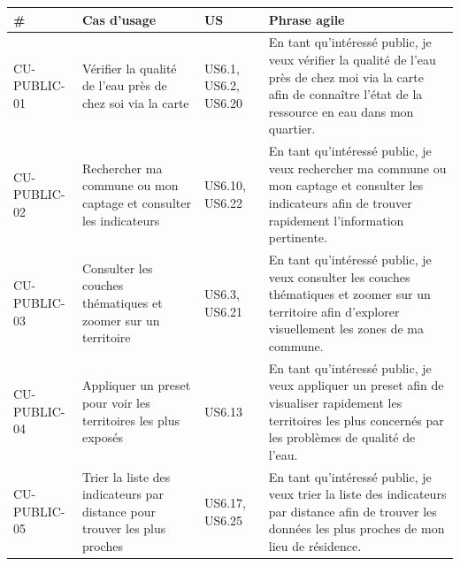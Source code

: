 \documentclass[
  paper=a4,
  oneside  ,captions=tableheading
]{scrartcl}
\begin{document}
{\def\LTcaptype{none} %
\begin{longtable}[]{@{}
  >{\raggedright\arraybackslash}p{}
  >{\raggedright\arraybackslash}p{}
  >{\raggedright\arraybackslash}p{}
  >{\raggedright\arraybackslash}p{}@{}}
\toprule\noalign{}
\begin{minipage}[b]{\linewidth}\raggedright
\#
\end{minipage} & \begin{minipage}[b]{\linewidth}\raggedright
Cas d'usage
\end{minipage} & \begin{minipage}[b]{\linewidth}\raggedright
US
\end{minipage} & \begin{minipage}[b]{\linewidth}\raggedright
Phrase agile
\end{minipage} \\
\midrule\noalign{}
\endhead
\bottomrule\noalign{}
\endlastfoot
CU-PUBLIC-01 & Vérifier la qualité de l'eau près de chez soi via la
carte & US6.1, US6.2, US6.20 & En tant qu'intéressé public, je veux
vérifier la qualité de l'eau près de chez moi via la carte afin de
connaître l'état de la ressource en eau dans mon quartier. \\
CU-PUBLIC-02 & Rechercher ma commune ou mon captage et consulter les
indicateurs & US6.10, US6.22 & En tant qu'intéressé public, je veux
rechercher ma commune ou mon captage et consulter les indicateurs afin
de trouver rapidement l'information pertinente. \\
CU-PUBLIC-03 & Consulter les couches thématiques et zoomer sur un
territoire & US6.3, US6.21 & En tant qu'intéressé public, je veux
consulter les couches thématiques et zoomer sur un territoire afin
d'explorer visuellement les zones de ma commune. \\
CU-PUBLIC-04 & Appliquer un preset pour voir les territoires les plus
exposés & US6.13 & En tant qu'intéressé public, je veux appliquer un
preset afin de visualiser rapidement les territoires les plus concernés
par les problèmes de qualité de l'eau. \\
CU-PUBLIC-05 & Trier la liste des indicateurs par distance pour trouver
les plus proches & US6.17, US6.25 & En tant qu'intéressé public, je veux
trier la liste des indicateurs par distance afin de trouver les données
les plus proches de mon lieu de résidence. \\
\end{longtable}
}
\end{document}
